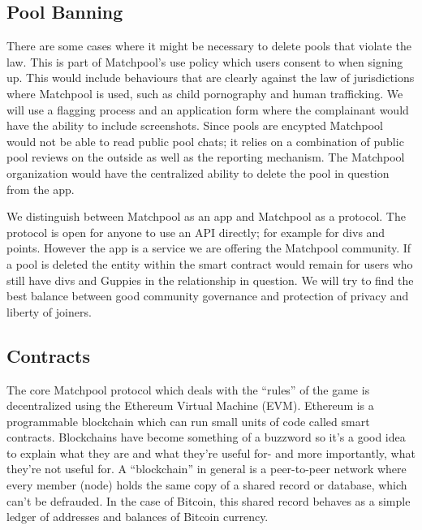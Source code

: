 \documentclass[a4paper]{article}
\begin{document}
\subsection{Pool Banning}

There are some cases where it might be necessary to delete pools that violate the law. This is part of Matchpool’s use policy which users consent to when signing up. This would include behaviours that are clearly against the law of jurisdictions where Matchpool is used, such as  child pornography and human trafficking. We will use a flagging process and an application form where the complainant would have the ability to include screenshots. Since pools are encypted Matchpool would not be able to read public pool chats; it relies on a combination of public pool reviews on the outside as well as the reporting mechanism. The Matchpool organization would have the centralized ability to delete the pool in question from the app.

We distinguish between Matchpool as an app and Matchpool as a protocol. The protocol is open for anyone to use an API directly; for example for divs and points. However the app is a service we are offering the Matchpool community. If a pool is deleted the entity within the smart contract would remain for users who still have divs and Guppies in the relationship in question. We will try to find the best balance between good community governance and protection of privacy and liberty of joiners.

\subsection{Contracts}

The core Matchpool protocol which deals with the “rules” of the game is decentralized using the Ethereum Virtual Machine (EVM). Ethereum is a programmable blockchain which can run small units of code called smart contracts. Blockchains have become something of a buzzword so it's a good idea to explain what they are and what they're useful for- and more importantly, what they're not useful for.
A “blockchain” in general is a peer-to-peer network where every member (node) holds the same copy of a shared record or database, which can't be defrauded. In the case of Bitcoin, this shared record behaves as a simple ledger of addresses and balances of Bitcoin currency.
\end{document}
